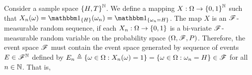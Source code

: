 \documentclass[letterpaper,10pt,english]{article}
\begin{document}
\begin{shaded}
\begin{exmp} 
\label{exmp:BernoulliSeqDefn}
Consider a sample space $\left\{H,T\right\}^{\mathbb{N}}$. 
We define a mapping $X: \Omega \to \left\{0,1\right\}^{\mathbb{N}}$ such that $X_n(\omega) = \SetIn{H}(\omega_n) = \SetIn{\omega_n = H}$. %
The map $X$ is an $\mathscr{F}$-measurable random sequence, if each $X_n: \Omega \to \left\{0,1\right\}$ is a bi-variate $\mathscr{F}$-measurable random variable on the probability space $(\Omega,\mathscr{F},P)$. 
Therefore, the event space $\mathscr{F}$ must contain the event space generated by sequence of events $E\in\mathscr{F}^{\mathbb{N}}$ defined by $E_n \triangleq \left\{\omega \in \Omega: X_n(\omega)=1\right\} = \left\{\omega \in \Omega: \omega_n = H\right\} \in \mathscr{F}$ for all $n\in \mathbb{N}$. 
That is, 
\end{exmp}
\end{shaded}
\end{document}
